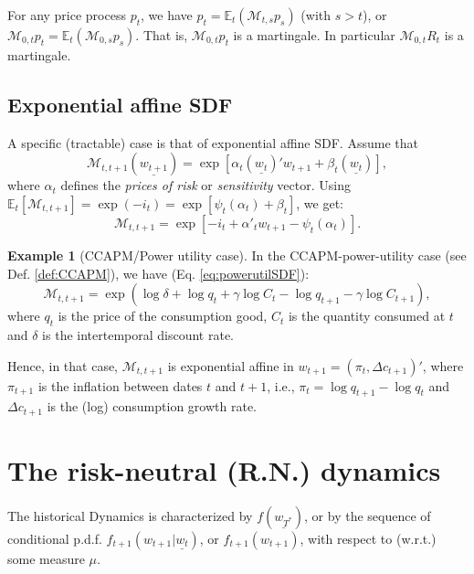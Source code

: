 \documentclass[
  12pt,
]{book}
\theoremstyle{definition}
\theoremstyle{definition}
\newtheorem{example}{Example}[chapter]
\theoremstyle{definition}
\theoremstyle{definition}
\theoremstyle{remark}
\begin{document}
For any price process \(p_t\), we have \(p_t = \mathbb{E}_t(\mathcal{M}_{t,s} p_s)\) (with \(s>t\)), or \(\mathcal{M}_{0,t} p_t = \mathbb{E}_t(\mathcal{M}_{0,s}p_s)\). That is, \(\mathcal{M}_{0,t} p_t\) is a martingale. In particular \(\mathcal{M}_{0,t} R_t\) is a martingale.

\hypertarget{PricingAffine}{%
\subsection{Exponential affine SDF}\label{PricingAffine}}

A specific (tractable) case is that of exponential affine SDF. Assume that
\[
\mathcal{M}_{t,t+1}(\underline{w_{t+1}}) = \exp[\alpha_t(\underline{w_t})'w_{t+1}+\beta_t(\underline{w_t})],
\]
where \(\alpha_t\) defines the \emph{prices of risk} or \emph{sensitivity} vector. Using \(\mathbb{E}_t[\mathcal{M}_{t,t+1}]=\exp(-i_{t})=\exp[\psi_t(\alpha_t)+\beta_t]\), we get:
\begin{equation}
\boxed{\mathcal{M}_{t,t+1} = \exp[-i_{t}+\alpha'_tw_{t+1}-\psi_t(\alpha_t)].}\label{eq:keySDF}
\end{equation}

\begin{example}[CCAPM/Power utility case]
In the CCAPM-power-utility case (see Def. \ref{def:CCAPM}), we have (Eq. \eqref{eq:powerutilSDF}):
\[
\mathcal{M}_{t,t+1} = \exp(\log \delta + \log q_t + \gamma \log   C_t - \log   q_{t+1} - \gamma  \log   C_{t+1}),
\]
where \(q_t\) is the price of the consumption good, \(C_t\) is the quantity consumed at \(t\) and \(\delta\) is the intertemporal discount rate.

Hence, in that case, \(\mathcal{M}_{t,t+1}\) is exponential affine in \(w_{t+1} = (\pi_t, \Delta c_{t+1})'\), where \(\pi_{t+1}\) is the inflation between dates \(t\) and \(t+1\), i.e., \(\pi_t = \log q_{t+1} - \log q_{t}\) and \(\Delta c_{t+1}\) is the (log) consumption growth rate.
\end{example}

\hypertarget{PricingRN}{%
\section{The risk-neutral (R.N.) dynamics}\label{PricingRN}}

The historical Dynamics is characterized by \(f(\underline{w_{T^*}})\), or by the
sequence of conditional p.d.f. \(f_{t+1}(w_{t+1}|\underline{w_t})\), or
\(f_{t+1}(w_{t+1})\), with respect to (w.r.t.) some measure \(\mu\).
\end{document}
